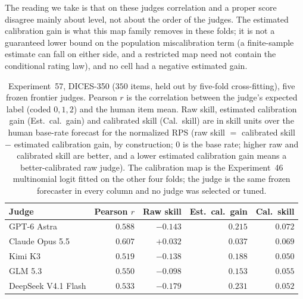 The reading we take is that on these judges correlation and a proper score disagree mainly about level, not about the order of the judges.
The estimated calibration gain is what this map family removes in these folds; it is not a guaranteed lower bound on the population miscalibration term (a finite-sample estimate can fall on either side, and a restricted map need not contain the conditional rating law), and no cell had a negative estimated gain.

\begin{table}[t]
\centering
\footnotesize
\setlength{\tabcolsep}{2pt}
\begin{tabular}{@{}lrrrr@{}}
\toprule
Judge & Pearson $r$ & Raw skill & Est.\ cal.\ gain & Cal.\ skill \\
\midrule
GPT-6 Astra & $0.588$ & $-0.143$ & $0.215$ & $0.072$ \\
Claude Opus 5.5 & $0.607$ & $+0.032$ & $0.037$ & $0.069$ \\
Kimi K3 & $0.519$ & $-0.138$ & $0.188$ & $0.050$ \\
GLM 5.3 & $0.550$ & $-0.098$ & $0.153$ & $0.055$ \\
DeepSeek V4.1 Flash & $0.533$ & $-0.179$ & $0.231$ & $0.052$ \\
\bottomrule
\end{tabular}
\caption{Experiment~57, DICES-350 ($350$ items, held out by five-fold cross-fitting), five frozen frontier judges. Pearson $r$ is the correlation between the judge's expected label (coded $0,1,2$) and the human item mean. Raw skill, estimated calibration gain (Est.\ cal.\ gain) and calibrated skill (Cal.\ skill) are in skill units over the human base-rate forecast for the normalized RPS (raw skill $=$ calibrated skill $-$ estimated calibration gain, by construction; $0$ is the base rate; higher raw and calibrated skill are better, and a lower estimated calibration gain means a better-calibrated raw judge). The calibration map is the Experiment~46 multinomial logit fitted on the other four folds; the judge is the same frozen forecaster in every column and no judge was selected or tuned.}
\label{tab:supp-dices350-split}
\end{table}

